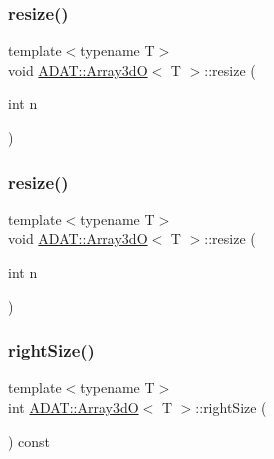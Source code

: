 \mbox{\label{classADAT_1_1Array3dO_ade806f07a366f5217783998dda678b6f}} 
\subsubsection{\texorpdfstring{resize()}{resize()}\hspace{0.1cm}{\footnotesize\ttfamily [5/6]}}
{\footnotesize\ttfamily template$<$typename T$>$ \\
void \mbox{\hyperlink{classADAT_1_1Array3dO}{A\+D\+A\+T\+::\+Array3dO}}$<$ T $>$\+::resize (\begin{DoxyParamCaption}\item[{int}]{n }\end{DoxyParamCaption})\hspace{0.3cm}{\ttfamily [inline]}}

\mbox{\label{classADAT_1_1Array3dO_ade806f07a366f5217783998dda678b6f}} 
\subsubsection{\texorpdfstring{resize()}{resize()}\hspace{0.1cm}{\footnotesize\ttfamily [6/6]}}
{\footnotesize\ttfamily template$<$typename T$>$ \\
void \mbox{\hyperlink{classADAT_1_1Array3dO}{A\+D\+A\+T\+::\+Array3dO}}$<$ T $>$\+::resize (\begin{DoxyParamCaption}\item[{int}]{n }\end{DoxyParamCaption})\hspace{0.3cm}{\ttfamily [inline]}}

\mbox{\label{classADAT_1_1Array3dO_a81a9bfa7afe224267642e822ebe09457}} 
\subsubsection{\texorpdfstring{rightSize()}{rightSize()}\hspace{0.1cm}{\footnotesize\ttfamily [1/3]}}
{\footnotesize\ttfamily template$<$typename T$>$ \\
int \mbox{\hyperlink{classADAT_1_1Array3dO}{A\+D\+A\+T\+::\+Array3dO}}$<$ T $>$\+::right\+Size (\begin{DoxyParamCaption}{ }\end{DoxyParamCaption}) const\hspace{0.3cm}{\ttfamily [inline]}}

